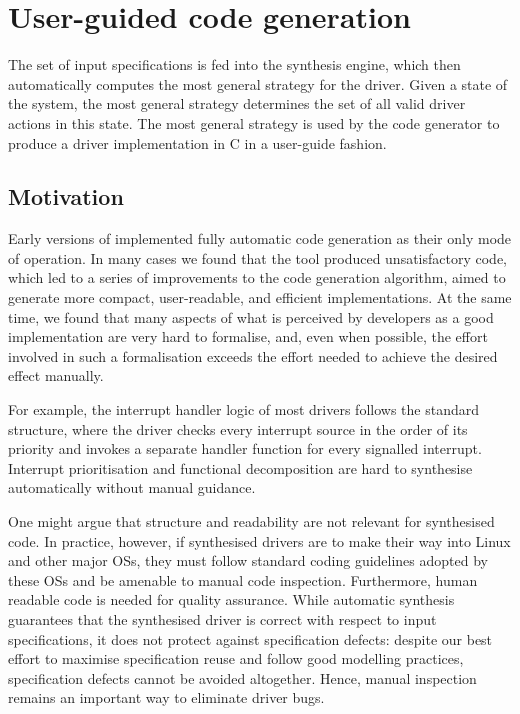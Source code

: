 \section{User-guided code generation}
\label{s:user-guided}

The set of input \tsl specifications is fed into the \termite synthesis engine, which then automatically computes the most general strategy for the driver.  Given a state of the system, the most general strategy determines the set of all valid driver actions in this state.  The most general strategy is used by the \termite code generator to produce a driver implementation in C in a user-guide fashion.

\subsection{Motivation}

Early versions of \termite implemented fully automatic code generation as their only mode of operation.  In many cases we found that the tool produced unsatisfactory code, which led to a series of improvements to the code generation algorithm, aimed to generate more compact, user-readable, and efficient implementations.  At the same time, we found that many aspects of what is perceived by developers as a good implementation are very hard to formalise, and, even when possible, the effort involved in such a formalisation exceeds the effort needed to achieve the desired effect manually.

For example, the interrupt handler logic of most drivers follows the standard structure, where the driver checks every interrupt source in the order of its priority and invokes a separate handler function for every signalled interrupt.  Interrupt prioritisation and functional decomposition are hard to synthesise automatically without manual guidance.

One might argue that structure and readability are not relevant for synthesised code.  In practice, however, if synthesised drivers are to make their way into Linux and other major OSs, they must follow standard coding guidelines adopted by these OSs and be amenable to manual code inspection.  Furthermore, human readable code is needed for quality assurance.  While automatic synthesis guarantees that the synthesised driver is correct with respect to input specifications, it does not protect against specification defects: despite our best effort to maximise specification reuse and follow good modelling practices, specification defects cannot be avoided altogether.  Hence, manual inspection remains an important way to eliminate driver bugs.

